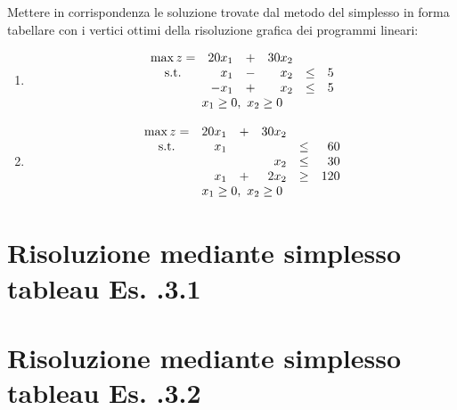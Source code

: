 \documentclass{beamer}
\def\presentationtype{3}
\begin{document}
\generatitolo

\begin{frame}[allowframebreaks]{\esercizi}

{\footnotesize Mettere in corrispondenza le soluzione trovate dal metodo
	del simplesso in forma tabellare con i vertici ottimi della
	risoluzione grafica dei programmi lineari:}
	
\begin{enumerate}
\item
$$\begin{array}{crrrcr}
\max z=& 20 x_1 &+& 30 x_2\\
{\rm s.t.} &  x_1 &-&  x_2 & \leq & 5 \\
           &- x_1 &+&  x_2 & \leq & 5  \\
           \multicolumn{6}{c}{x_1 \geq 0,\ x_2 \geq 0}
\end{array}%
$$%

\item
$$\begin{array}{crrrcr}
\max z=& 20 x_1 &+& 30 x_2\\
{\rm s.t.} &  x_1 & &      & \leq &  60 \\
           &      & &  x_2 & \leq &  30 \\
           &  x_1 &+&2 x_2 & \geq & 120 \\
           \multicolumn{6}{c}{x_1 \geq 0,\ x_2 \geq 0}
\end{array}%
$$%

\end{enumerate}

\end{frame}

\section{Risoluzione mediante simplesso tableau Es. \nolezione.\presentationtype.1}



\section{Risoluzione mediante simplesso tableau Es. \nolezione.\presentationtype.2}

\end{document}
